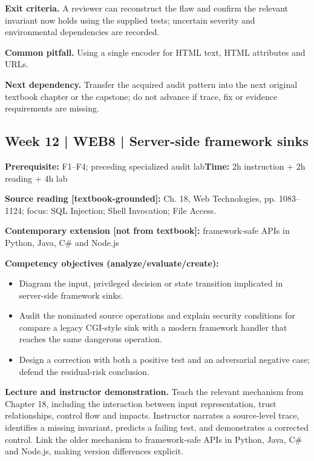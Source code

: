 \documentclass[10pt,letterpaper]{article}
\begin{document}
\textbf{Exit criteria.} A reviewer can reconstruct the flaw and confirm the relevant invariant now holds using the supplied tests; uncertain severity and environmental dependencies are recorded.

\textbf{Common pitfall.} Using a single encoder for HTML text, HTML attributes and URLs.

\textbf{Next dependency.} Transfer the acquired audit pattern into the next original textbook chapter or the capstone; do not advance if trace, fix or evidence requirements are missing.

\subsection{Week 12 | WEB8 | Server-side framework sinks}
\textbf{Prerequisite:} F1--F4; preceding specialized audit lab\hfill\textbf{Time:} 2h instruction + 2h reading + 4h lab

\textbf{Source reading [textbook-grounded]:} Ch. 18, Web Technologies, pp. 1083--1124; focus: SQL Injection; Shell Invocation; File Access.

\textbf{Contemporary extension [not from textbook]:} framework-safe APIs in Python, Java, C\# and Node.js

\textbf{Competency objectives (analyze/evaluate/create):}
\begin{itemize}[leftmargin=*,itemsep=2pt]
\item Diagram the input, privileged decision or state transition implicated in server-side framework sinks.
\item Audit the nominated source operations and explain security conditions for compare a legacy CGI-style sink with a modern framework handler that reaches the same dangerous operation.
\item Design a correction with both a positive test and an adversarial negative case; defend the residual-risk conclusion.
\end{itemize}
\textbf{Lecture and instructor demonstration.} Teach the relevant mechanism from Chapter 18, including the interaction between input representation, trust relationships, control flow and impacts. Instructor narrates a source-level trace, identifies a missing invariant, predicts a failing test, and demonstrates a corrected control. Link the older mechanism to framework-safe APIs in Python, Java, C\# and Node.js, making version differences explicit.
\end{document}
